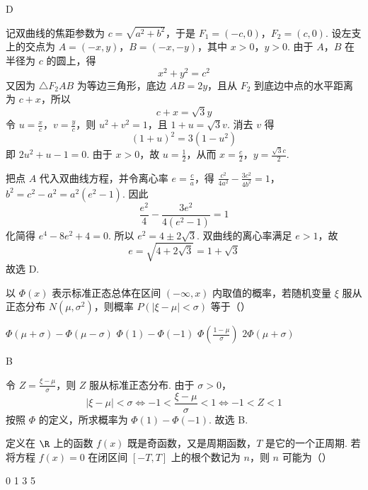\begin{answer}
D
\end{answer}

\begin{solution}
记双曲线的焦距参数为 \(c=\sqrt{a^2+b^2}\)，于是 \(F_1=(-c,0)\)，\(F_2=(c,0)\). 设左支上的交点为 \(A=(-x,y)\)，\(B=(-x,-y)\)，其中 \(x>0\)，\(y>0\). 由于 \(A\)，\(B\) 在半径为 \(c\) 的圆上，得
\[
x^2+y^2=c^2
\]
又因为 \(\triangle F_2AB\) 为等边三角形，底边 \(AB=2y\)，且从 \(F_2\) 到底边中点的水平距离为 \(c+x\)，所以
\[
c+x=\sqrt{3}y
\]
令 \(u=\frac{x}{c}\)，\(v=\frac{y}{c}\)，则 \(u^2+v^2=1\)，且 \(1+u=\sqrt{3}v\). 消去 \(v\) 得
\[
(1+u)^2=3(1-u^2)
\]
即 \(2u^2+u-1=0\). 由于 \(x>0\)，故 \(u=\frac12\)，从而 \(x=\frac c2\)，\(y=\frac{\sqrt{3}c}{2}\).

把点 \(A\) 代入双曲线方程，并令离心率 \(e=\frac ca\)，得
\(\frac{c^2}{4a^2}-\frac{3c^2}{4b^2}=1\)，\(b^2=c^2-a^2=a^2(e^2-1)\).
因此
\[
\frac{e^2}{4}-\frac{3e^2}{4(e^2-1)}=1
\]
化简得 \(e^4-8e^2+4=0\). 所以 \(e^2=4\pm2\sqrt{3}\). 双曲线的离心率满足 \(e>1\)，故
\[
e=\sqrt{4+2\sqrt{3}}=1+\sqrt{3}
\]
故选 D.
\end{solution}

\begin{problem}
以 \(\Phi(x)\) 表示标准正态总体在区间 \((- \infty, x)\) 内取值的概率，若随机变量 \(\xi\) 服从正态分布 \(N(\mu, \sigma^2)\)，则概率 \(P(|\xi - \mu| < \sigma)\) 等于（\quad）

\choices
    {\(\Phi (\mu +\sigma) - \Phi (\mu -\sigma)\)}
    {\(\Phi (1) - \Phi (-1)\)}
    {\(\Phi \left(\frac{1 - \mu}{\sigma}\right)\)}
    {\(2\Phi (\mu +\sigma)\)}
\end{problem}

\begin{answer}
B
\end{answer}

\begin{solution}
令 \(Z=\frac{\xi-\mu}{\sigma}\)，则 \(Z\) 服从标准正态分布. 由于 \(\sigma>0\)，
\[
|\xi-\mu|<\sigma\iff-1<\frac{\xi-\mu}{\sigma}<1\iff-1<Z<1
\]
按照 \(\Phi\) 的定义，所求概率为 \(\Phi(1)-\Phi(-1)\). 故选 B.
\end{solution}

\begin{problem}
定义在 \(\R\) 上的函数 \(f(x)\) 既是奇函数，又是周期函数，\(T\) 是它的一个正周期. 若将方程 \(f(x) = 0\) 在闭区间 \([-T, T]\) 上的根个数记为 \(n\)，则 \(n\) 可能为（\quad）

\choices
    {0}
    {1}
    {3}
    {5}
\end{problem}

